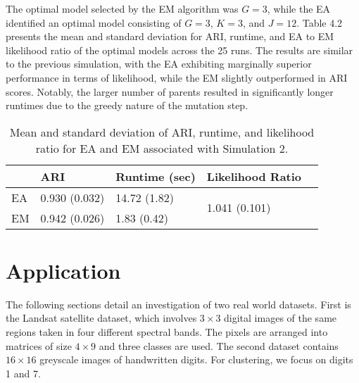 \documentclass[12pt]{report}
\begin{document}
The optimal model selected by the EM algorithm was $G=3$, while the EA identified an optimal model consisting of $G=3$, $K=3$, and $J=12$. Table 4.2 presents the mean and standard deviation for ARI, runtime, and EA to EM likelihood ratio of the optimal models across the 25 runs. The results are similar to the previous simulation, with the EA exhibiting marginally superior performance in terms of likelihood, while the EM slightly outperformed in ARI scores. Notably, the larger number of parents resulted in significantly longer runtimes due to the greedy nature of the mutation step.

\begin{table}[!ht]
  \caption{Mean and standard deviation of ARI, runtime, and likelihood ratio for EA and EM associated with Simulation 2.}
    \vspace{0.5cm}
  \begin{tabularx}{\textwidth}{l *{3}{X}c}
  \toprule
    &\textbf{ARI}& \textbf{Runtime (sec)}  & \textbf{Likelihood Ratio} \\
  \midrule
  EA & 0.930 (0.032)     & 14.72 (1.82) & \multirow{2}{*}{1.041 (0.101)}  \\
  EM & 0.942 (0.026)    & 1.83 (0.42)   \\
  \bottomrule
  \end{tabularx}
\end{table}






\chapter{Application}
The following sections detail an investigation of two real world datasets. First is the Landsat satellite dataset, which involves $3 \times 3$ digital images of the same regions taken in four different spectral bands. The pixels are arranged into matrices of size $4 \times 9$ and three classes are used. The second dataset contains $16 \times 16$ greyscale images of handwritten digits. For clustering, we focus on digits 1 and 7.  




\end{document}

